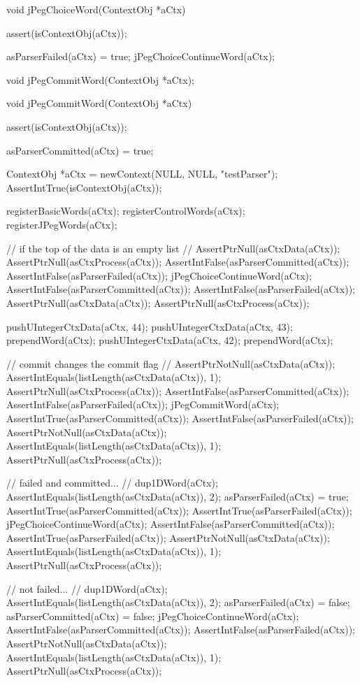 \startCCode
void jPegChoiceWord(ContextObj *aCtx) {
  assert(isContextObj(aCtx));
  
  asParserFailed(aCtx) = true;
  jPegChoiceContinueWord(aCtx);
}
\stopCCode

\startCHeader
void jPegCommitWord(ContextObj *aCtx);
\stopCHeader

\startCCode
void jPegCommitWord(ContextObj *aCtx) {
  assert(isContextObj(aCtx));
  
  asParserCommitted(aCtx) = true;
}
\stopCCode


\startCTest
  ContextObj *aCtx = newContext(NULL, NULL, "testParser");
  AssertIntTrue(isContextObj(aCtx));
  
  registerBasicWords(aCtx);
  registerControlWords(aCtx);
  registerJPegWords(aCtx);

  // if the top of the data is an empty list
  //
  AssertPtrNull(asCtxData(aCtx));
  AssertPtrNull(asCtxProcess(aCtx));
  AssertIntFalse(asParserCommitted(aCtx));
  AssertIntFalse(asParserFailed(aCtx));
  jPegChoiceContinueWord(aCtx);
  AssertIntFalse(asParserCommitted(aCtx));
  AssertIntFalse(asParserFailed(aCtx));
  AssertPtrNull(asCtxData(aCtx));
  AssertPtrNull(asCtxProcess(aCtx));
  
  pushUIntegerCtxData(aCtx, 44);
  pushUIntegerCtxData(aCtx, 43);
  prependWord(aCtx);
  pushUIntegerCtxData(aCtx, 42);
  prependWord(aCtx);
  
  // commit changes the commit flag
  //
  AssertPtrNotNull(asCtxData(aCtx));
  AssertIntEquals(listLength(asCtxData(aCtx)), 1);
  AssertPtrNull(asCtxProcess(aCtx));
  AssertIntFalse(asParserCommitted(aCtx));
  AssertIntFalse(asParserFailed(aCtx));
  jPegCommitWord(aCtx);
  AssertIntTrue(asParserCommitted(aCtx));
  AssertIntFalse(asParserFailed(aCtx));
  AssertPtrNotNull(asCtxData(aCtx));
  AssertIntEquals(listLength(asCtxData(aCtx)), 1);
  AssertPtrNull(asCtxProcess(aCtx));

  // failed and committed...
  //
  dup1DWord(aCtx);
  AssertIntEquals(listLength(asCtxData(aCtx)), 2);
  asParserFailed(aCtx) = true;
  AssertIntTrue(asParserCommitted(aCtx));
  AssertIntTrue(asParserFailed(aCtx));
  jPegChoiceContinueWord(aCtx);
  AssertIntFalse(asParserCommitted(aCtx));
  AssertIntTrue(asParserFailed(aCtx));
  AssertPtrNotNull(asCtxData(aCtx));
  AssertIntEquals(listLength(asCtxData(aCtx)), 1);
  AssertPtrNull(asCtxProcess(aCtx));
  
  // not failed...
  //
  dup1DWord(aCtx);
  AssertIntEquals(listLength(asCtxData(aCtx)), 2);
  asParserFailed(aCtx)   = false;
  asParserCommitted(aCtx) = false;
  jPegChoiceContinueWord(aCtx);
  AssertIntFalse(asParserCommitted(aCtx));
  AssertIntFalse(asParserFailed(aCtx));
  AssertPtrNotNull(asCtxData(aCtx));
  AssertIntEquals(listLength(asCtxData(aCtx)), 1);
  AssertPtrNull(asCtxProcess(aCtx));
  
